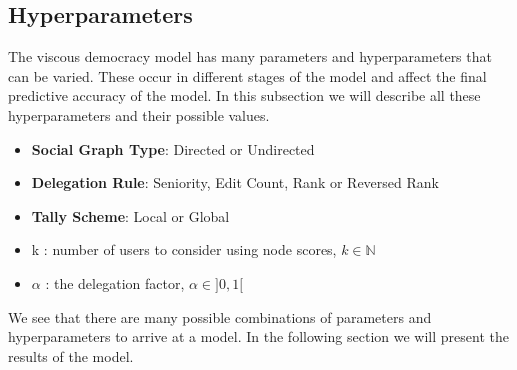 \subsection{Hyperparameters}
The viscous democracy model has many parameters and hyperparameters that can be varied. These occur in different stages of the model and affect the final predictive accuracy of the model. In this subsection we will describe all these hyperparameters and their possible values.

\begin{itemize}
    \item \textbf{Social Graph Type}: Directed or Undirected
    \item \textbf{Delegation Rule}: Seniority, Edit Count, Rank or Reversed Rank 
    \item \textbf{Tally Scheme}: Local or Global
    \item k : number of users to consider using node scores, $k \in \mathbb{N}$
    \item $\alpha$ : the delegation factor, $\alpha\in ]0,1[$
\end{itemize}
We see that there are many possible combinations of parameters and hyperparameters to arrive at a model. In the following section we will present the results of the model. 